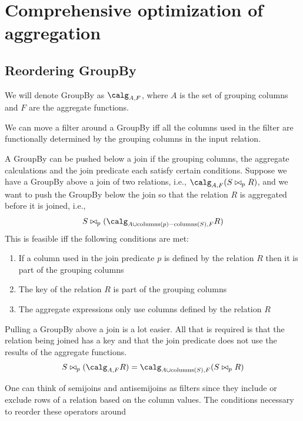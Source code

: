 \documentclass[11pt]{article}
\begin{document}
\section{Comprehensive optimization of aggregation}
\label{sec:org15a1c0e}
\subsection{Reordering GroupBy}
\label{sec:orgbc173a7}
We will denote GroupBy as \(\calg_{A,F}\), where \(A\) is the set of grouping columns and \(F\) are
the aggregate functions.

We can move a filter around a GroupBy iff all the columns used in the filter are functionally
determined by the grouping columns in the input relation.

A GroupBy can be pushed below a join if the grouping columns, the aggregate calculations and the join
predicate each satisfy certain conditions. Suppose we have a GroupBy above a join of two relations,
i.e., \(\calg_{A,F}(S\bowtie_pR)\), and we want to push the GroupBy below the join so that the
relation \(R\) is aggregated before it is joined, i.e.,
\begin{equation*}
S\bowtie_p(\calg_{A\cup\text{columns}(p)-\text{columns}(S),F}R)
\end{equation*}
This is feasible iff the following conditions are met:
\begin{enumerate}
\item If a column used in the join predicate \(p\) is defined by the relation \(R\) then it is part of
the grouping columns
\item The key of the relation \(R\)  is part of the grouping columns
\item The aggregate expressions only use columns defined by the relation \(R\)
\end{enumerate}

Pulling a GroupBy above a join is a lot easier. All that is required is that the relation being joined
has a key and that the join predicate does not use the results of the aggregate functions.
\begin{equation*}
S\bowtie_p(\calg_{A,F}R)=\calg_{A\cup\text{columns}(S),F}(S\bowtie_pR)
\end{equation*}

One can think of semijoins and antisemijoins as filters since they include or exclude rows of a
relation based on the column values. The conditions necessary to reorder these operators around
\end{document}
